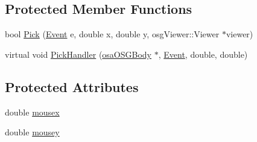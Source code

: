 \subsection*{Protected Member Functions}
\begin{DoxyCompactItemize}
\item 
bool \hyperlink{classosa_o_s_g_pick_ae0660ad69e814ce749256a260f33cc56}{Pick} (\hyperlink{classosa_o_s_g_pick_af50ae1a966b6f3282b707d73f87081d8}{Event} e, double x, double y, osg\-Viewer\-::\-Viewer $\ast$viewer)
\item 
virtual void \hyperlink{classosa_o_s_g_pick_a94f0070f479012ffa3c5717c617072c9}{Pick\-Handler} (\hyperlink{classosa_o_s_g_body}{osa\-O\-S\-G\-Body} $\ast$, \hyperlink{classosa_o_s_g_pick_af50ae1a966b6f3282b707d73f87081d8}{Event}, double, double)
\end{DoxyCompactItemize}
\subsection*{Protected Attributes}
\begin{DoxyCompactItemize}
\item 
double \hyperlink{classosa_o_s_g_pick_a6a873ebac73e6a50727bf6899f4d3ba9}{mousex}
\item 
double \hyperlink{classosa_o_s_g_pick_a0ff8d75903e0ff5611df44df27d2b374}{mousey}
\end{DoxyCompactItemize}


